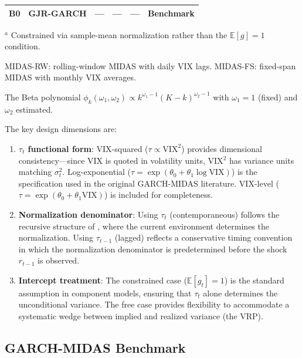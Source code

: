 \documentclass[12pt,a4paper]{article}
\newcommand{\E}{\mathbb{E}}
\begin{document}
\begin{table}[H]
\begin{threeparttable}
\begin{tabular}{@{}llllll@{}}
\midrule
B0 & GJR-GARCH & --- & --- & --- & Benchmark \\
\bottomrule
\end{tabular}
\begin{tablenotes}
\footnotesize
\item $^a$ Constrained via sample-mean normalization rather than the $\E[g]=1$ condition.
\item MIDAS-RW: rolling-window MIDAS with daily VIX lags. MIDAS-FS: fixed-span MIDAS with monthly VIX averages.
\item The Beta polynomial $\phi_k(\omega_1,\omega_2) \propto k^{\omega_1-1}(K-k)^{\omega_2-1}$ with $\omega_1 = 1$ (fixed) and $\omega_2$ estimated.
\end{tablenotes}
\end{threeparttable}
\end{table}

The key design dimensions are:
\begin{enumerate}
\item \textbf{$\tau_t$ functional form}: VIX-squared ($\tau \propto \mathrm{VIX}^2$) provides dimensional consistency---since VIX is quoted in volatility units, VIX$^2$ has variance units matching $\sigma_t^2$. Log-exponential ($\tau = \exp(\theta_0 + \theta_1 \log \mathrm{VIX})$) is the specification used in the original GARCH-MIDAS literature. VIX-level ($\tau = \exp(\theta_0 + \theta_1 \mathrm{VIX})$) is included for completeness.

\item \textbf{Normalization denominator}: Using $\tau_t$ (contemporaneous) follows the recursive structure of \citet[Eq.~4]{engle2013}, where the current environment determines the normalization. Using $\tau_{t-1}$ (lagged) reflects a conservative timing convention in which the normalization denominator is predetermined before the shock $r_{t-1}$ is observed.

\item \textbf{Intercept treatment}: The constrained case ($\E[g_t]=1$) is the standard assumption in component models, ensuring that $\tau_t$ alone determines the unconditional variance. The free case provides flexibility to accommodate a systematic wedge between implied and realized variance (the VRP).
\end{enumerate}

\subsection{GARCH-MIDAS Benchmark}
\label{sec:midas}
\end{document}
